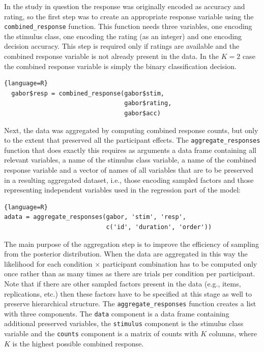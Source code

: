 \documentclass[oneside,a4paper]{article}
\begin{document}
In the study in question the response was originally encoded as
accuracy and rating, so the first step was to create an appropriate
response variable using the \texttt{combined\_response} function. This
function needs three variables, one encoding the stimulus class, one
encoding the rating (as an integer) and one encoding decision
accuracy. This step is required only if ratings are available and the
combined response variable is not already present in the data. In the
$K=2$ case the combined response variable is simply the binary
classification decision.

\begin{lstlisting}{language=R}
  gabor$resp = combined_response(gabor$stim, 
                                 gabor$rating, 
                                 gabor$acc)
\end{lstlisting}


Next, the data was aggregated by computing combined response counts,
but only to the extent that preserved all the participant effects. The
\texttt{aggregate\_responses} function that does exactly this requires
as arguments a data frame containing all relevant variables, a name of
the stimulus class variable, a name of the combined response variable
and a vector of names of all variables that are to be preserved in a
resulting aggregated dataset, i.e., those encoding sampled factors and
those representing independent variables used in the regression part
of the model:

\begin{lstlisting}{language=R}
adata = aggregate_responses(gabor, 'stim', 'resp', 
                            c('id', 'duration', 'order'))  
\end{lstlisting}

The main purpose of the aggregation step is to improve the efficiency
of sampling from the posterior distribution. When the data are
aggregated in this way the likelihood for each condition $\times$
participant combination has to be computed only once rather than as
many times as there are trials per condition per participant. Note
that if there are other sampled factors present in the data (e.g.,
items, replications, etc.) then these factors have to be specified at
this stage as well to preserve hierarchical structure. The
\texttt{aggregate\_responses} function creates a list with three
components. The \texttt{data} component is a data frame containing
additional preserved variables, the \texttt{stimulus} component is the
stimulus class variable and the \texttt{counts} component is a matrix
of counts with $K$ columns, where $K$ is the highest possible combined
response.
\end{document}
